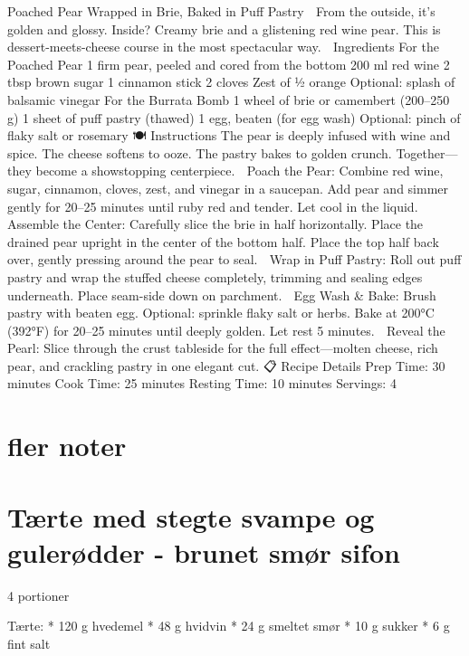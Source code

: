 \documentclass[
  letterpaper,
  DIV=11,
  numbers=noendperiod]{scrreprt}
\begin{document}
Poached Pear Wrapped in Brie, Baked in Puff Pastry 💫 From the outside,
it's golden and glossy. Inside? Creamy brie and a glistening red wine
pear. This is dessert-meets-cheese course in the most spectacular way.
🛒 Ingredients For the Poached Pear 1 firm pear, peeled and cored from
the bottom 200 ml red wine 2 tbsp brown sugar 1 cinnamon stick 2 cloves
Zest of ½ orange Optional: splash of balsamic vinegar For the Burrata
Bomb 1 wheel of brie or camembert (200--250 g) 1 sheet of puff pastry
(thawed) 1 egg, beaten (for egg wash) Optional: pinch of flaky salt or
rosemary 🍽️ Instructions The pear is deeply infused with wine and spice.
The cheese softens to ooze. The pastry bakes to golden crunch.
Together---they become a showstopping centerpiece. 🍷 Poach the Pear:
Combine red wine, sugar, cinnamon, cloves, zest, and vinegar in a
saucepan. Add pear and simmer gently for 20--25 minutes until ruby red
and tender. Let cool in the liquid. 🧀 Assemble the Center: Carefully
slice the brie in half horizontally. Place the drained pear upright in
the center of the bottom half. Place the top half back over, gently
pressing around the pear to seal. 🧈 Wrap in Puff Pastry: Roll out puff
pastry and wrap the stuffed cheese completely, trimming and sealing
edges underneath. Place seam-side down on parchment. 🥚 Egg Wash \&
Bake: Brush pastry with beaten egg. Optional: sprinkle flaky salt or
herbs. Bake at 200°C (392°F) for 20--25 minutes until deeply golden. Let
rest 5 minutes. 🔪 Reveal the Pearl: Slice through the crust tableside
for the full effect---molten cheese, rich pear, and crackling pastry in
one elegant cut. 📋 Recipe Details Prep Time: 30 minutes Cook Time: 25
minutes Resting Time: 10 minutes Servings: 4

\hypertarget{fler-noter}{%
\section{fler noter}\label{fler-noter}}

\hypertarget{tuxe6rte-med-stegte-svampe-og-guleruxf8dder---brunet-smuxf8r-sifon}{%
\section{Tærte med stegte svampe og gulerødder - brunet smør
sifon}\label{tuxe6rte-med-stegte-svampe-og-guleruxf8dder---brunet-smuxf8r-sifon}}

4 portioner

Tærte: * 120 g hvedemel * 48 g hvidvin * 24 g smeltet smør * 10 g sukker
* 6 g fint salt
\end{document}

